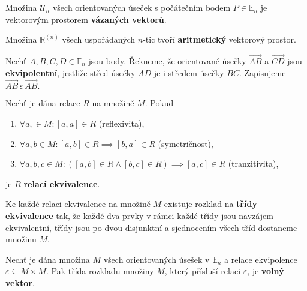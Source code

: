 \begin{pozn}
    Množina $\mathscr U_n$ všech orientovaných úseček s počátečním bodem $P\in \mathbb E_n$
    je vektorovým prostorem
    \textbf{vázaných vektorů}.
\end{pozn}

\begin{pozn}
    Množina $\mathbb R^{(n)}$ všech uspořádaných $n$-tic tvoří \textbf{aritmetický}
    vektorový prostor.
\end{pozn}

\begin{definition}
    Nechť $A,B,C,D \in \mathbb E_n$ jsou body. Řekneme, že orientované úsečky
    $\overrightarrow{AB}$ a $\overrightarrow{CD}$ jsou \textbf{ekvipolentní}, jestliže
    střed úsečky $AD$ je i středem úsečky $BC$. Zapisujeme $\overrightarrow{AB}\,\varepsilon\,\overrightarrow{AB}.$
\end{definition}

\begin{definition}
    Nechť je dána relace $R$ na množině $M$. Pokud
    \begin{enumerate}[$i.$]
    \item $\forall a,\in M:[a,a] \in R$ (reflexivita),
   	\item $\forall a,b\in M: [a,b]\in R \implies [b,a] \in R$ (symetričnost),
   	\item $\forall a,b,c\in M: ([a,b]\in R \land [b,c] \in R) \implies [a,c] \in R$ (tranzitivita),
    \end{enumerate}
    je $R$ \textbf{relací ekvivalence}.
\end{definition}

\begin{pozn}
    Ke každé relaci ekvivalence na množině $M$ existuje rozklad na
    \textbf{třídy ekvivalence} tak, že každé dva prvky v rámci každé třídy jsou navzájem ekvivalentní,
    třídy jsou po dvou disjunktní a sjednocením všech tříd dostaneme množinu $M$.
\end{pozn}

\begin{definition}
    Nechť je dána množina $M$ všech orientovaných úsešek v $\mathbb E_n$ a
    relace ekvipolence $\varepsilon \subseteq M\times M.$ Pak třída rozkladu množiny
    $M$, který přísluší relaci $\varepsilon$, je \textbf{volný vektor}.
\end{definition}

